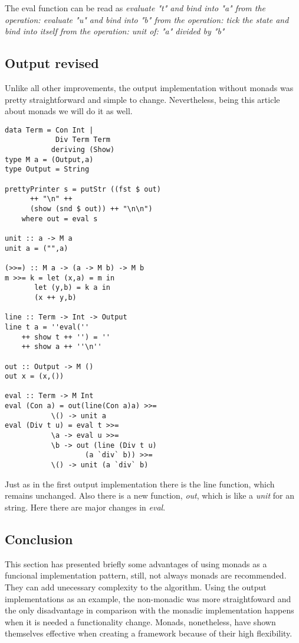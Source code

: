 \documentclass[twocolumn,10pt]{article}
\begin{document}
The eval function can be read as \textit{evaluate "t" and bind into "a" from the operation: evaluate "u" and bind into "b" from the operation: tick the state and bind into itself from the operation: unit of: "a" divided by "b"}

\subsection{Output revised}
Unlike all other improvements, the output implementation without monads was pretty straightforward and simple to change. Nevertheless, being this article about monads we will do it as well. 

\lstset{language=Haskell}
\begin{lstlisting}
data Term = Con Int | 
            Div Term Term 
           deriving (Show)
type M a = (Output,a)
type Output = String

prettyPrinter s = putStr ((fst $ out) 
      ++ "\n" ++ 
      (show (snd $ out)) ++ "\n\n")
	where out = eval s

unit :: a -> M a
unit a = ("",a)

(>>=) :: M a -> (a -> M b) -> M b
m >>= k = let (x,a) = m in
	   let (y,b) = k a in
	   (x ++ y,b)

line :: Term -> Int -> Output
line t a = ''eval('' 
	++ show t ++ '') = '' 
	++ show a ++ ''\n''

out :: Output -> M ()
out x = (x,())

eval :: Term -> M Int
eval (Con a) = out(line(Con a)a) >>=
           \() -> unit a
eval (Div t u) = eval t >>=
           \a -> eval u >>=
           \b -> out (line (Div t u) 
                   (a `div` b)) >>=
           \() -> unit (a `div` b)
\end{lstlisting}

Just as in the first output implementation there is the line function, which remains unchanged. Also there is a new function, \textit{out}, which is like a \textit{unit} for an string. Here there are major changes in \textit{eval}.

\subsection{Conclusion}
This section has presented briefly some advantages of using monads as a funcional implementation pattern, still, not always monads are recommended. They can add unecessary complexity to the algorithm. Using the output implementations as an example, the non-monadic was more straightfoward and the only disadvantage in comparison with the monadic implementation happens when it is needed a functionality change. Monads, nonetheless, have shown themselves effective when creating a framework because of their high flexibility.
\end{document}
